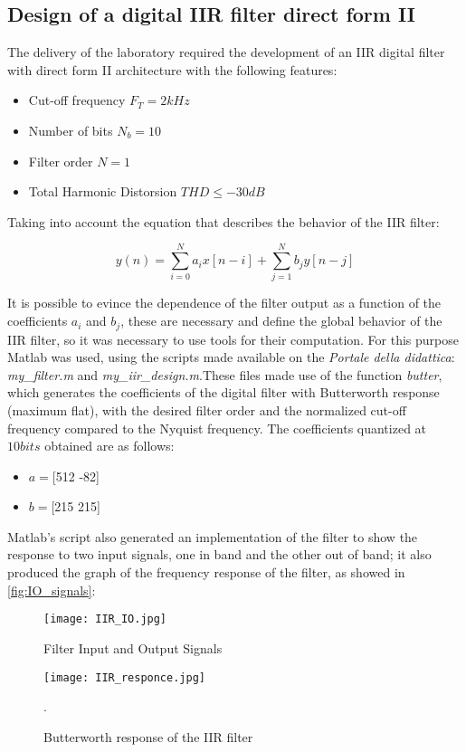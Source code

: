 \subsection{Design of a digital IIR filter direct form II}

The delivery of the laboratory required the development of an IIR digital filter with direct form II architecture with the following features:

\begin{itemize}
\item Cut-off frequency $F_{T} = 2 kHz$
\item Number of bits $N_{b} = 10$
\item Filter order $N = 1$
\item Total Harmonic Distorsion $THD \leq -30 dB$
\end{itemize}

\noindent Taking into account the equation that describes the behavior of the IIR filter:

\begin{equation}
y(n) = \sum_{i=0}^N a_{i}x[n-i]  + \sum_{j=1}^N b_{j}y[n-j]
\end{equation}

It is possible to evince the dependence of the filter output as a function of the coefficients $a_{i}$ and $b_{j}$, these are necessary and define the global behavior of the IIR filter, so it was necessary to use tools for their computation. For this purpose Matlab was used, using the scripts made available on the \textit{Portale della didattica}: \textit{my\_filter.m} and \textit{my\_iir\_design.m}.These files made use of the function \textit{butter}, which generates the coefficients of the digital filter with Butterworth response (maximum flat), with the desired filter order and the normalized cut-off frequency compared to the Nyquist frequency. The coefficients quantized at $10 bits$ obtained are as follows:

\begin{itemize}
\item $a = $[512 -82]
\item $b = $[215 215]
\end{itemize}

Matlab's script also generated an implementation of the filter to show the response to two input signals, one in band and the other out of band; it also produced the graph of the frequency response of the filter, as showed in \autoref{fig:IO_signals}:

\begin{figure}[ht]
	\begin{minipage}[b]{0.52\linewidth}
		\centering
		\texttt{[image: IIR\_IO.jpg]}
		\caption{Filter Input and Output Signals}
		\label{fig:IO_signals}
	\end{minipage}
	\hspace{0.1cm}
	\begin{minipage}[b]{0.45\linewidth}
		\centering
		\texttt{[image: IIR\_responce.jpg]}
		\caption{Butterworth response of the IIR filter}.
		\label{fig:Butterworth}
	\end{minipage}
\end{figure}

